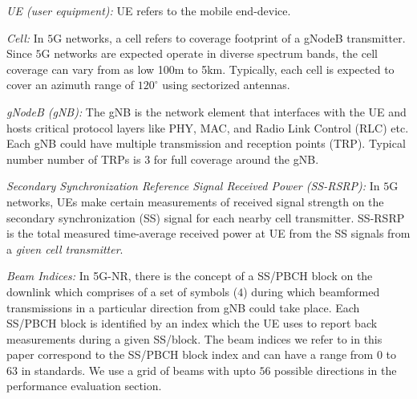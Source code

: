 \documentclass[conference, 10pt]{IEEEtran}
\begin{document}
{\em UE (user equipment):} UE refers to the mobile end-device.

{\em Cell:} In $5$G networks, a cell refers to coverage footprint of a gNodeB transmitter. Since $5$G networks are expected operate in diverse spectrum bands, the cell coverage can vary from as low 100m to 5km. Typically, each cell is expected to cover an azimuth range of $120^\circ$ using sectorized antennas.

{\em gNodeB (gNB):} The gNB is the network element that interfaces with the UE and
hosts critical protocol layers like PHY, MAC, and Radio Link Control (RLC) etc. Each
gNB could have multiple transmission and reception points (TRP). Typical number number of TRPs is $3$ for full coverage around the gNB.

{\em Secondary Synchronization Reference Signal Received Power (SS-RSRP):} In $5$G networks, UEs make certain
measurements of received signal strength on the secondary synchronization (SS) signal for each nearby cell transmitter. SS-RSRP is
the total measured time-average received power at UE from the SS signals 
from a {\em given cell transmitter}. 

{\em Beam Indices:} In 5G-NR, there is the concept of a SS/PBCH block on the downlink which comprises of a set of symbols ($4$) during which beamformed transmissions in a particular direction from gNB could take place. Each SS/PBCH block is identified by an index which the UE uses to report back measurements during a given SS/block. The beam indices we refer to in this paper correspond to the SS/PBCH block index and can have a range from $0$ to $63$ in standards. We use a grid of beams with upto $56$ possible directions in the performance evaluation section.  




\end{document}
